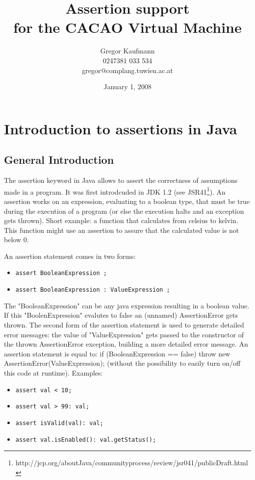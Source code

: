 \documentclass{article}%
\begin{document}
\title{Assertion support \\for the CACAO Virtual Machine}
\author{{Gregor Kaufmann}
\\0247381 033 534
\\gregor@complang.tuwien.ac.at}
\date{January 1, 2008}
\maketitle
\pagebreak

\tableofcontents
\pagebreak


\section{Introduction to assertions in Java}
\subsection{General Introduction}
The assertion keyword in Java allows to assert the correctness of assumptions made in a program. It was first introdcuded in JDK 1.2 (see JSR41\footnote{http://jcp.org/aboutJava/communityprocess/review/jsr041/publicDraft.html}). An assertion works on an expression, evaluating to a boolean type, that must be true during the execution of a program (or else the execution halts and an exception gets thrown). Short example: a function that calculates from celsius to kelvin. This function might use an assertion to assure that the calculated value is not below 0.

An assertion statement comes in two forms:
\begin{itemize}
\item \verb'assert BooleanExpression ;'
\item \verb'assert BooleanExpression : ValueExpression ;'
\end{itemize}
The "BooleanExpression" can be any java expression resulting in a boolean value. If this "BoolenExpression" evalutes to false an (unnamed) AssertionError gets thrown. The second form of the assertion statement is used to generate detailed error messages: the value of "ValueExpression" gets passed to the constructor of the thrown AssertionError exception, building a more detailed error message. An assertion statement is equal to: if (BooleanExpression == false) throw new AssertionError(ValueExpression); (without the possibility to easily turn on/off this code at runtime).
Examples:
\begin{itemize}
\item \verb'assert val < 10;'
\item \verb'assert val > 99: val;'
\item \verb'assert isValid(val): val;'
\item \verb'assert val.isEnabled(): val.getStatus();'
\end{itemize}
\end{document}
